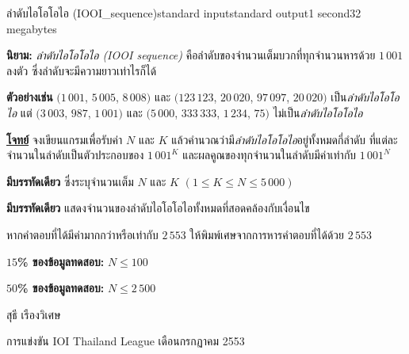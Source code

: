 \documentclass[11pt,a4paper]{article}
\begin{document}
\begin{problem}{ลำดับไอโอโอไอ (IOOI\_sequence)}{standard input}{standard output}{1 second}{32 megabytes}

\textbf{นิยาม:} \textit{ลำดับไอโอโอไอ (IOOI sequence)} คือลำดับของจำนวนเต็มบวกที่ทุกจำนวนหารด้วย $1\,001$ ลงตัว ซึ่งลำดับจะมีความยาวเท่าไรก็ได้

\textbf{ตัวอย่างเช่น} $(1\,001$, $5\,005$, $8\,008)$ และ $(123\,123$, $20\,020$, $97\,097$, $20\,020)$ เป็น\textit{ลำดับไอโอโอไอ} แต่ $(3\,003$, $987$, $1\,001)$ และ $(5\,000$, $333\,333$, $1\,234$, $75)$ ไม่เป็น\textit{ลำดับไอโอโอไอ}

\bigskip
\underline{\textbf{โจทย์}}  จงเขียนแกรมเพื่อรับค่า $N$ และ $K$ แล้วคำนวณว่ามี\textit{ลำดับไอโอโอไอ}อยู่ทั้งหมดกี่ลำดับ ที่แต่ละจำนวนในลำดับเป็นตัวประกอบของ $1\,001^K$ และผลคูณของทุกจำนวนในลำดับมีค่าเท่ากับ $1\,001^N$


\InputFile

\textbf{มีบรรทัดเดียว} ซึ่งระบุจำนวนเต็ม $N$ และ $K$ $(1 \leq K \leq N \leq 5\,000)$


\OutputFile

\textbf{มีบรรทัดเดียว} แสดงจำนวนของลำดับไอโอโอไอทั้งหมดที่สอดคล้องกับเงื่อนไข

หากคำตอบที่ได้มีค่ามากกว่าหรือเท่ากับ $2\,553$ ให้พิมพ์เศษจากการหารคำตอบที่ได้ด้วย $2\,553$

\Examples

\begin{example}
%
%
\end{example}

\Scoring 

\textbf{$15$\% ของข้อมูลทดสอบ:} $N \leq 100$

\textbf{$50$\% ของข้อมูลทดสอบ:} $N \leq 2\,500$

\Source

สุธี เรืองวิเศษ
 
การแข่งขัน IOI Thailand League เดือนกรกฏาคม 2553

\end{problem}
\end{document}
